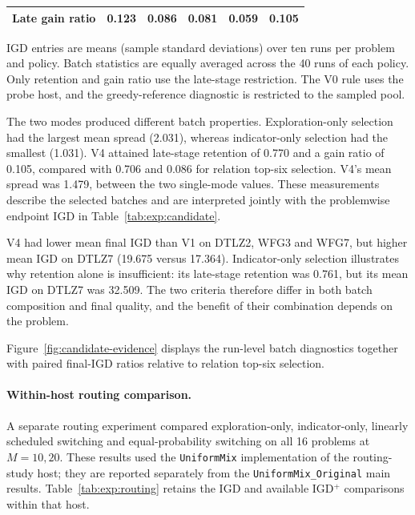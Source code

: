 \documentclass[final,5p,times,twocolumn]{elsarticle}
\begin{document}
\begin{table}[t]
\begin{tabular}{lccccc}
Late gain ratio & 0.123 & 0.086 & 0.081 & 0.059 & 0.105 \\
\bottomrule
\end{tabular}
\par\smallskip
\begin{minipage}{\linewidth}
\scriptsize IGD entries are means (sample standard deviations) over ten runs per problem and policy. Batch statistics are equally averaged across the 40 runs of each policy. Only retention and gain ratio use the late-stage restriction. The V0 rule uses the probe host, and the greedy-reference diagnostic is restricted to the sampled pool.
\end{minipage}
\end{table}

The two modes produced different batch properties. Exploration-only
selection had the largest mean spread (2.031), whereas indicator-only
selection had the smallest (1.031). V4 attained late-stage retention
of 0.770 and a gain ratio of 0.105, compared with 0.706 and 0.086 for
relation top-six selection. V4's mean spread was 1.479, between the two
single-mode values. These measurements describe the selected batches
and are interpreted jointly with the problemwise endpoint IGD in
Table~\ref{tab:exp:candidate}.

V4 had lower mean final IGD than V1 on DTLZ2, WFG3 and WFG7, but higher
mean IGD on DTLZ7 (19.675 versus 17.364). Indicator-only selection
illustrates why retention alone is insufficient: its late-stage
retention was 0.761, but its mean IGD on DTLZ7 was 32.509. The two
criteria therefore differ in both batch composition and final quality,
and the benefit of their combination depends on the problem.

Figure~\ref{fig:candidate-evidence} displays the run-level batch diagnostics
together with paired final-IGD ratios relative to relation top-six selection.


\paragraph{Within-host routing comparison.}
A separate routing experiment compared exploration-only,
indicator-only, linearly scheduled switching and equal-probability
switching on all 16 problems at $M=10,20$. These results used the
\texttt{UniformMix} implementation of the routing-study host; they are
reported separately from the \texttt{UniformMix\_Original} main results.
Table~\ref{tab:exp:routing} retains the IGD and available IGD$^+$
comparisons within that host.
\end{document}
